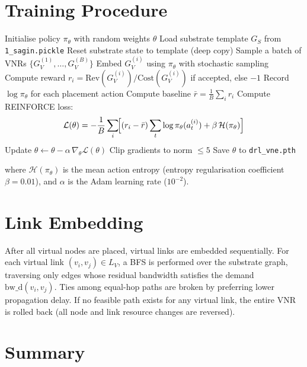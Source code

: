 \documentclass[12pt,a4paper]{report}
\begin{document}
\section{Training Procedure}

\begin{algorithm}[H]
\caption{DRL-VNE Training with REINFORCE}
\label{alg:training}
\begin{algorithmic}[1]
\State Initialise policy $\pi_\theta$ with random weights $\theta$
\State Load substrate template $G_S$ from \texttt{1\_sagin.pickle}
  \State Reset substrate state to template (deep copy)
  \State Sample a batch of VNRs $\{G_V^{(1)},\ldots,G_V^{(B)}\}$
    \State Embed $G_V^{(i)}$ using $\pi_\theta$ with stochastic sampling
    \State Compute reward $r_i = \text{Rev}(G_V^{(i)})/\text{Cost}(G_V^{(i)})$
           if accepted, else $-1$
    \State Record $\log\pi_\theta$ for each placement action
  \EndFor
  \State Compute baseline $\bar{r} = \tfrac{1}{B}\sum_i r_i$
  \State Compute REINFORCE loss:
    \[
      \mathcal{L}(\theta) =
        -\frac{1}{B}\sum_{i}\!\Bigl[
          (r_i - \bar{r})\sum_t\log\pi_\theta(a_t^{(i)})
          + \beta\,\mathcal{H}(\pi_\theta)\Bigr]
    \]
  \State Update $\theta \leftarrow \theta - \alpha\,\nabla_\theta\mathcal{L}(\theta)$
  \State Clip gradients to norm $\leq 5$
\EndFor
\State Save $\theta$ to \texttt{drl\_vne.pth}
\end{algorithmic}
\end{algorithm}

where $\mathcal{H}(\pi_\theta)$ is the mean action entropy (entropy regularisation coefficient
$\beta=0.01$), and $\alpha$ is the Adam learning rate ($10^{-2}$).

\section{Link Embedding}

After all virtual nodes are placed, virtual links are embedded sequentially. For each virtual
link $(v_i,v_j)\in L_V$, a BFS is performed over the substrate graph, traversing only edges
whose residual bandwidth satisfies the demand $\text{bw\_d}(v_i,v_j)$. Ties among equal-hop
paths are broken by preferring lower propagation delay. If no feasible path exists for any
virtual link, the entire VNR is rolled back (all node and link resource changes are reversed).

\section{Summary}
\end{document}

